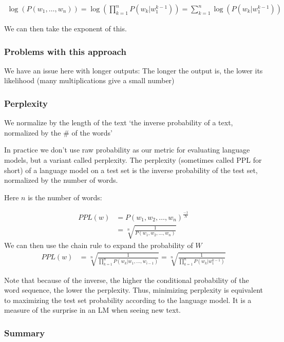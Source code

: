 \documentclass[11pt]{article}
\begin{document}
\begin{align*}
    \log(P(w_1, \ldots, w_n)) = \log(\prod^n_{k=1}P(w_k|w_1^{k-1})) = \sum^n_{k=1}\log(P(w_k|w_1^{k-1}))
\end{align*}

We can then take the exponent of this.

\subsubsection{Problems with this approach}

We have an issue here with longer outputs: The longer the output is, the lower its likelihood (many multiplications give a small number)

\subsubsection{Perplexity}

We normalize by the length of the text `the inverse probability of a text, normalized by the \# of the words'

\begin{definition}[Perplexity]
    In practice we don't use raw probability as our metric for evaluating language models, but a variant called perplexity. The perplexity (sometimes called PPL for short) of a language model on a test set is the inverse probability of the test set, normalized by the number of words.
\end{definition}

Here $n$ is the number of words:

\begin{align*}
    PPL(w) & =P(w_1,w_2,\ldots,w_n)^\frac{-1}{N} \\
    & = \sqrt[n]{\frac{1}{P(w_1,w_2,\ldots,w_n)}}
\end{align*}
We can then use the chain rule to expand the probability of $W$
\begin{align*}
    PPL(w) & = \sqrt[n]{\frac{1}{\prod^n_{k=1}P(w_k|w_1,\ldots,w_{i-1})}} = \sqrt[n]{\frac{1}{\prod^n_{k=1}P(w_k|w_1^{k-1})}}
\end{align*}

Note that because of the inverse, the higher the conditional probability of the word sequence, the lower the perplexity. Thus, minimizing perplexity is equivalent to maximizing the test set probability according to the language model. It is a measure of the surprise in an LM when seeing new text.

\subsubsection{Summary}
\end{document}
